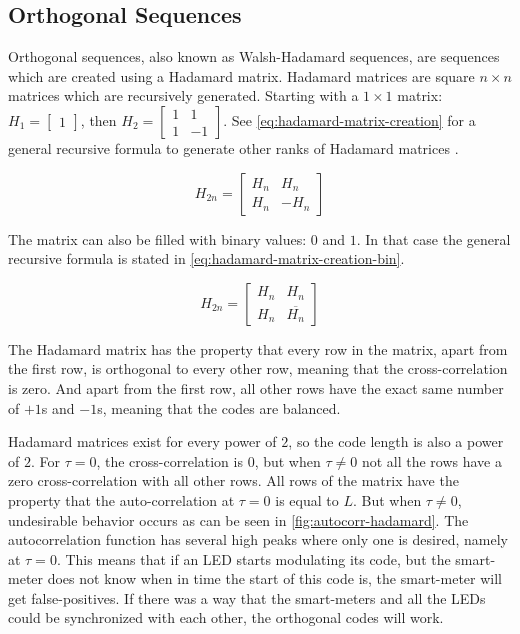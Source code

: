 
\subsection{Orthogonal Sequences}
\label{subsec:orthogonal-sequences}

Orthogonal sequences, also known as Walsh-Hadamard sequences, are sequences which are created using a Hadamard matrix.
Hadamard matrices are square $n \times n$ matrices which are recursively generated.
Starting with a $1 \times 1$ matrix: 
		$H_{1} = \begin{bmatrix} 1 \end{bmatrix}$, then 
		$H_{2} = \begin{bmatrix} 1 & 1 \\ 1 & -1 \end{bmatrix}$.
See \autoref{eq:hadamard-matrix-creation} for a general recursive formula to generate other ranks of Hadamard matrices \cite{714616}.

\begin{equation}
	H_{2n} = 
	\begin{bmatrix} 
		H_n & H_n \\ 
		H_n & -H_n 
	\end{bmatrix}
	\label{eq:hadamard-matrix-creation}
\end{equation}

The matrix can also be filled with binary values: $0$ and $1$. In that case the general recursive formula is stated in \autoref{eq:hadamard-matrix-creation-bin}. 

\begin{equation}
	H_{2n} = 
	\begin{bmatrix} 
		H_n & H_n \\ 
		H_n & \overline{H_n}
	\end{bmatrix}
	\label{eq:hadamard-matrix-creation-bin}
\end{equation}




The Hadamard matrix has the property that every row in the matrix, apart from the first row, is orthogonal to every other row, meaning that the cross-correlation is zero.
And apart from the first row, all other rows have the exact same number of $+1$s and $-1$s, meaning that the codes are balanced.

Hadamard matrices exist for every power of $2$, so the code length is also a power of $2$.
For $\tau = 0$, the cross-correlation is $0$, but when $\tau \neq 0$ not all the rows have a zero cross-correlation with all other rows.
All rows of the matrix have the property that the auto-correlation at $\tau = 0$ is equal to $L$.
But when $\tau \neq 0$, undesirable behavior occurs as can be seen in \autoref{fig:autocorr-hadamard}.
The autocorrelation function has several high peaks where only one is desired, namely at $\tau = 0$.
This means that if an LED starts modulating its code, but the smart-meter does not know when in time the start of this code is, the smart-meter will get false-positives.
If there was a way that the smart-meters and all the LEDs could be synchronized with each other, the orthogonal codes will work.

